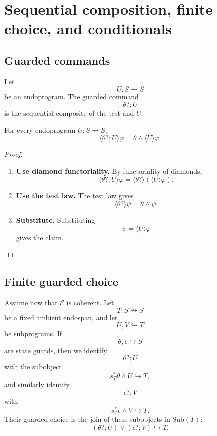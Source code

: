 \section{Sequential composition, finite choice, and conditionals}
\label{sec:poly-relative-tests-choice}

\subsection{Guarded commands}
\label{subsec:poly-relative-tests-guarded-commands}
Let
\[
U:S\nrightarrow S
\]
be an endoprogram.  The guarded command
\[
\theta?;U
\]
is the sequential composite of the test and \(U\).

\begin{proposition}
\label{prop:poly-relative-guard-prefix-law}
For every endoprogram \(U:S\nrightarrow S\),
\[
\langle\theta?;U\rangle\varphi
=
\theta\wedge\langle U\rangle\varphi.
\]
\end{proposition}

\begin{proof}
\leavevmode
\begin{enumerate}
\item \textbf{Use diamond functoriality.}
By functoriality of diamonds,
\[
\langle\theta?;U\rangle\varphi
=
\langle\theta?\rangle(\langle U\rangle\varphi).
\]

\item \textbf{Use the test law.}
The test law gives
\[
\langle\theta?\rangle\psi=\theta\wedge\psi.
\]

\item \textbf{Substitute.}
Substituting
\[
\psi=\langle U\rangle\varphi
\]
gives the claim.
\end{enumerate}
\end{proof}

\subsection{Finite guarded choice}
\label{subsec:poly-relative-finite-guarded-choice}

Assume now that \(\mathcal E\) is coherent.  Let
\[
T:S\nrightarrow S
\]
be a fixed ambient endospan, and let
\[
U,V\hookrightarrow T
\]
be subprograms.  If
\[
\theta,\epsilon\hookrightarrow S
\]
are state guards, then we identify
\[
\theta?;U
\]
with the subobject
\[
s_T^\ast\theta\wedge U\hookrightarrow T,
\]
and similarly identify
\[
\epsilon?;V
\]
with
\[
s_T^\ast\epsilon\wedge V\hookrightarrow T.
\]
Their guarded choice is the join of these subobjects in \(\mathrm{Sub}(T)\):
\[
(\theta?;U)\vee(\epsilon?;V)\hookrightarrow T.
\]

